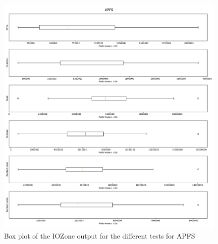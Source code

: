 \begin{figure}[!htb]
	\label{fig:res_box_apfs}
	\begin{center}
		\includegraphics[width=1.0\textwidth]{figures/benchmarking/local/APFS-box.pdf}
	\end{center}
	\caption{Box plot of the IOZone output for the different tests for \gls{APFS}}
\end{figure}